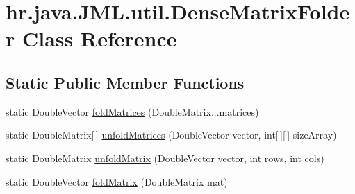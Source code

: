 \hypertarget{classhr_1_1java_1_1_j_m_l_1_1util_1_1_dense_matrix_folder}{\section{hr.\+java.\+J\+M\+L.\+util.\+Dense\+Matrix\+Folder Class Reference}
\label{classhr_1_1java_1_1_j_m_l_1_1util_1_1_dense_matrix_folder}
}
\subsection*{Static Public Member Functions}
\begin{DoxyCompactItemize}
\item 
static Double\+Vector \hyperlink{classhr_1_1java_1_1_j_m_l_1_1util_1_1_dense_matrix_folder_a322a9d5a5af15ffeca0a11e7772761ab}{fold\+Matrices} (Double\+Matrix...\+matrices)
\item 
static Double\+Matrix\mbox{[}$\,$\mbox{]} \hyperlink{classhr_1_1java_1_1_j_m_l_1_1util_1_1_dense_matrix_folder_a0d9c5a40c979367df898348c4781b1eb}{unfold\+Matrices} (Double\+Vector vector, int\mbox{[}$\,$\mbox{]}\mbox{[}$\,$\mbox{]} size\+Array)
\item 
static Double\+Matrix \hyperlink{classhr_1_1java_1_1_j_m_l_1_1util_1_1_dense_matrix_folder_ad64e17bc9f959157f5e857be642b00a5}{unfold\+Matrix} (Double\+Vector vector, int rows, int cols)
\item 
static Double\+Vector \hyperlink{classhr_1_1java_1_1_j_m_l_1_1util_1_1_dense_matrix_folder_abf332d6e1120572283da3a7c49166095}{fold\+Matrix} (Double\+Matrix mat)
\end{DoxyCompactItemize}


